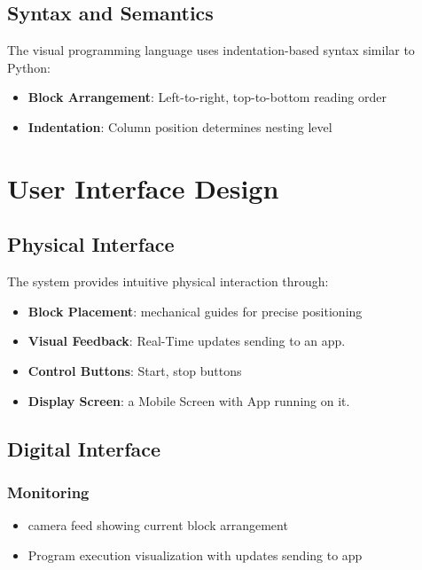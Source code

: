 \subsection{Syntax and Semantics}

The visual programming language uses indentation-based syntax similar to Python:

\begin{itemize}
    \item \textbf{Block Arrangement}: Left-to-right, top-to-bottom reading order
    \item \textbf{Indentation}: Column position determines nesting level

\end{itemize}



\section{User Interface Design}

\subsection{Physical Interface}

The system provides intuitive physical interaction through:

\begin{itemize}
    \item \textbf{Block Placement}: mechanical guides for precise positioning
    \item \textbf{Visual Feedback}: Real-Time updates sending to an app.
    \item \textbf{Control Buttons}: Start, stop buttons
    \item \textbf{Display Screen}: a Mobile Screen with App running on it.
\end{itemize}

\subsection{Digital Interface}

\subsubsection{Monitoring}
\begin{itemize}
    \item camera feed showing current block arrangement
    \item Program execution visualization with updates sending to app
\end{itemize}

